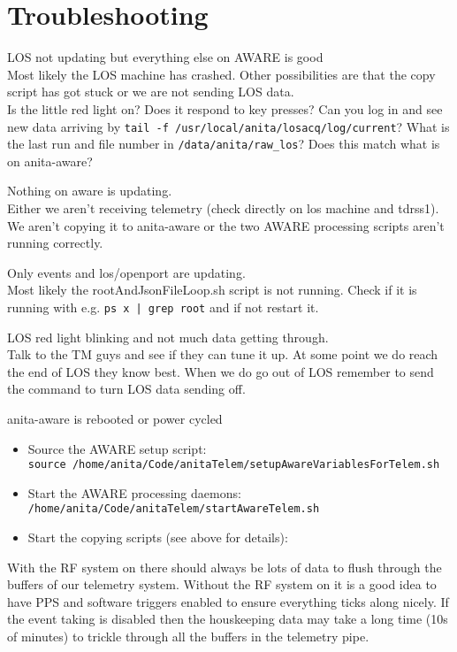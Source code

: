 \documentclass{article}
\begin{document}
\section{Troubleshooting}
\begin{description}
\item{LOS not updating but everything else on AWARE is good} \\Most likely the LOS machine has crashed. Other possibilities are that the copy script has got stuck or we are not sending LOS data. \\ Is the little red light on? Does it respond to key presses? Can you log in and see new data arriving by {\tt tail -f /usr/local/anita/losacq/log/current}? What is the last run and file number in {\tt /data/anita/raw\_los}? Does this match what is on anita-aware? 
\item{Nothing on aware is updating}. \\Either we aren't receiving telemetry (check directly on los machine and tdrss1). We aren't copying it to anita-aware or the two AWARE processing scripts aren't running correctly.
\item{Only events and los/openport are updating}. \\Most likely the rootAndJsonFileLoop.sh script is not running. Check if it is running with e.g. {\tt ps x | grep root} and if not restart it.
\item{LOS red light blinking and not much data getting through}. \\Talk to the TM guys and see if they can tune it up. At some point we do reach the end of LOS they know best. When we do go out of LOS remember to send the command to turn LOS data sending off.
\item{anita-aware is rebooted or power cycled} \\
\begin{itemize}
\item Source the AWARE setup script: \\ {\tt source /home/anita/Code/anitaTelem/setupAwareVariablesForTelem.sh} 
\item Start the AWARE processing daemons: \\
  {\tt /home/anita/Code/anitaTelem/startAwareTelem.sh}
\item Start the copying scripts (see above for details): \\
\end{itemize}
\end{description}

With the RF system on there should always be lots of data to flush through the buffers of our telemetry system. Without the RF system on it is a good idea to have PPS and software triggers enabled to ensure everything ticks along nicely. If the event taking is disabled then the houskeeping data may take a long time (10s of minutes) to trickle through all the buffers in the telemetry pipe.
\end{document}
